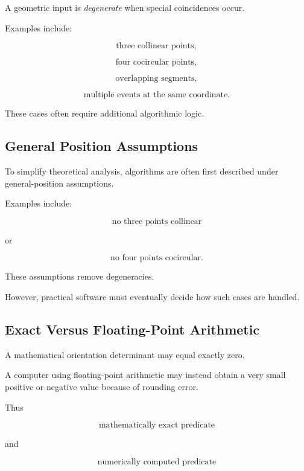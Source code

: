 A geometric input is \emph{degenerate} when special coincidences occur.

Examples include:

\[
\boxed{
\text{three collinear points},
}
\]

\[
\boxed{
\text{four cocircular points},
}
\]

\[
\boxed{
\text{overlapping segments},
}
\]

\[
\boxed{
\text{multiple events at the same coordinate}.
}
\]

These cases often require additional algorithmic logic.

\subsection{General Position Assumptions}
\label{subsec:computational-general-position}

To simplify theoretical analysis, algorithms are often first described under
general-position assumptions.

Examples include:

\[
\boxed{
\text{no three points collinear}
}
\]

or

\[
\boxed{
\text{no four points cocircular}.
}
\]

These assumptions remove degeneracies.

However, practical software must eventually decide how such cases are
handled.

\subsection{Exact Versus Floating-Point Arithmetic}
\label{subsec:exact-floating-geometry}

A mathematical orientation determinant may equal exactly zero.

A computer using floating-point arithmetic may instead obtain a very small
positive or negative value because of rounding error.

Thus

\[
\boxed{
\text{mathematically exact predicate}
}
\]

and

\[
\boxed{
\text{numerically computed predicate}
}
\]

